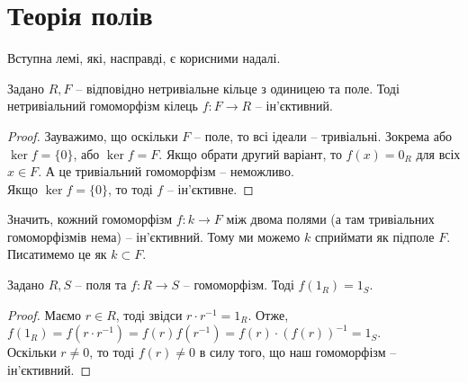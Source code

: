 \documentclass{math_library}
\begin{document}
\fi

\iffalse
\section{Теорія полів}
Вступна лемі, які, насправді, є корисними надалі.

\begin{lemma}
Задано $R,F$ -- відповідно нетривіальне кільце з одиницею та поле. Тоді нетривіальний гомоморфізм кілець $f \colon F \to R$ -- ін'єктивний.
\end{lemma}

\begin{proof}
Зауважимо, що оскільки $F$ -- поле, то всі ідеали -- тривіальні. Зокрема або $\ker f = \{0\}$, або $\ker f = F$. Якщо обрати другий варіант, то $f(x) = 0_R$ для всіх $x \in F$. А це тривіальний гомоморфізм -- неможливо.\\
Якщо $\ker f = \{0\}$, то тоді $f$ -- ін'єктивне.
\end{proof}

Значить, кожний гомоморфізм $f \colon k \to F$ між двома полями (а там тривіальних гомоморфізмів нема) -- ін'єктивний. Тому ми можемо $k$ сприймати як підполе $F$. Писатимемо це як $k \subset F$.

\begin{lemma}
Задано $R,S$ -- поля та $f \colon R \to S$ -- гомоморфізм. Тоді $f(1_R) = 1_S$.
\end{lemma}

\begin{proof}
Маємо $r \in R$, тоді звідси $r \cdot r^{-1} = 1_R$. Отже,\\
$f(1_R) = f(r \cdot r^{-1}) = f(r) f(r^{-1}) = f(r) \cdot (f(r))^{-1} = 1_S$.\\
Оскільки $r \neq 0$, то тоді $f(r) \neq 0$ в силу того, що наш гомоморфізм -- ін'єктивний.
\end{proof}

\newpage
\end{document}
